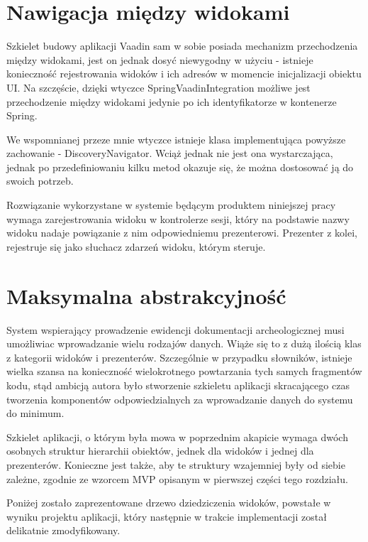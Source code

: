 \newpage
\section{Nawigacja między widokami}
Szkielet budowy aplikacji Vaadin sam w sobie posiada mechanizm przechodzenia między widokami, jest on jednak dosyć niewygodny w użyciu - istnieje konieczność rejestrowania widoków i ich adresów w momencie inicjalizacji obiektu UI. Na szczęście, dzięki wtyczce SpringVaadinIntegration możliwe jest przechodzenie między widokami jedynie po ich identyfikatorze w kontenerze Spring.

We wspomnianej przeze mnie wtyczce istnieje klasa implementująca powyższe zachowanie - DiscoveryNavigator. Wciąż jednak nie jest ona wystarczająca, jednak po przedefiniowaniu kilku metod okazuje się, że można dostosować ją do swoich potrzeb. 

Rozwiązanie wykorzystane w systemie będącym produktem niniejszej pracy wymaga zarejestrowania widoku w kontrolerze sesji, który na podstawie nazwy widoku nadaje powiązanie z nim odpowiedniemu prezenterowi. Prezenter z kolei, rejestruje się jako słuchacz zdarzeń widoku, którym steruje.

\section{Maksymalna abstrakcyjność}
System wspierający prowadzenie ewidencji dokumentacji archeologicznej musi umożliwiac wprowadzanie wielu rodzajów danych. Wiąże się to z dużą ilością klas z kategorii widoków i prezenterów. Szczególnie w przypadku słowników, istnieje wielka szansa na konieczność wielokrotnego powtarzania tych samych fragmentów kodu, stąd ambicją autora było stworzenie szkieletu aplikacji skracającego czas tworzenia komponentów odpowiedzialnych za wprowadzanie danych do systemu do minimum.

Szkielet aplikacji, o którym była mowa w poprzednim akapicie wymaga dwóch osobnych struktur hierarchii obiektów, jednek dla widoków i jednej dla prezenterów. Konieczne jest także, aby te struktury wzajemniej były od siebie zależne, zgodnie ze wzorcem MVP opisanym w pierwszej części tego rozdziału.

Poniżej zostało zaprezentowane drzewo dziedziczenia widoków, powstałe w wyniku projektu aplikacji, który następnie w trakcie implementacji został delikatnie zmodyfikowany. 

